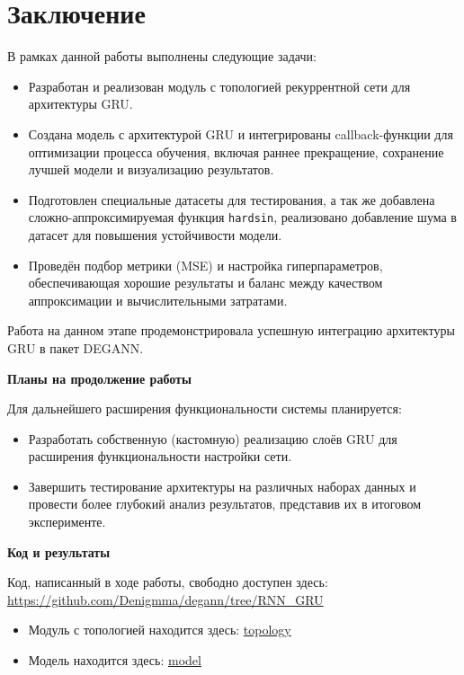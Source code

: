
\section*{Заключение}

В рамках данной работы выполнены следующие задачи:
\begin{itemize}
    \item Разработан и реализован модуль с топологией рекуррентной сети для архитектуры GRU.
    \item Создана модель с архитектурой GRU и интегрированы callback-функции для оптимизации процесса обучения, включая раннее прекращение, сохранение лучшей модели и визуализацию результатов.
    \item Подготовлен специальные датасеты для тестирования, а так же добавлена сложно-аппроксимируемая функция \texttt{hardsin}, реализовано добавление шума в датасет для повышения устойчивости модели.
    \item Проведён подбор метрики (MSE) и настройка гиперпараметров, обеспечивающая хорошие результаты и баланс между качеством аппроксимации и вычислительными затратами.
\end{itemize}

Работа на данном этапе продемонстрировала успешную интеграцию архитектуры GRU в пакет DEGANN.

\textbf{Планы на продолжение работы}


Для дальнейшего расширения функциональности системы планируется:
\begin{itemize}
    \item Разработать собственную (кастомную) реализацию слоёв GRU для расширения функциональности настройки сети.
    \item Завершить тестирование архитектуры на различных наборах данных и провести более глубокий анализ результатов, представив их в итоговом эксперименте.
\end{itemize}

\textbf{Код и результаты}


Код, написанный в ходе работы, свободно доступен здесь: \href{https://github.com/Denigmma/degann/tree/RNN_GRU}{https://github.com/Denigmma/degann/tree/RNN_GRU}
\begin{itemize}
    \item Модуль с топологией находится здесь: \href{https://github.com/Denigmma/degann/blob/RNN_GRU/degann/networks/topology/tf_RNN_GRU_NET.py}{topology}
    \item Модель находится здесь: \href{https://github.com/Denigmma/degann/blob/RNN_GRU/RNN/GRU/gru_model.py}{model}
\end{itemize}

